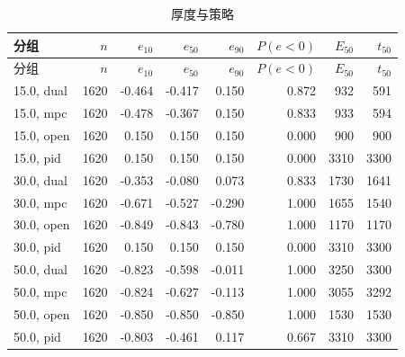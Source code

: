 \begin{longtable}{lrrrrrrr}
\caption{厚度与策略}\\
\toprule
分组 & $n$ & $e_{10}$ & $e_{50}$ & $e_{90}$ & $P(e{<}0)$ & $E_{50}$ & $t_{50}$ \\
\midrule
\endfirsthead
\toprule
分组 & $n$ & $e_{10}$ & $e_{50}$ & $e_{90}$ & $P(e{<}0)$ & $E_{50}$ & $t_{50}$ \\
\midrule
\endhead
15.0, dual & 1620 & -0.464 & -0.417 & 0.150 & 0.872 & 932 & 591 \\
15.0, mpc & 1620 & -0.478 & -0.367 & 0.150 & 0.833 & 933 & 594 \\
15.0, open & 1620 & 0.150 & 0.150 & 0.150 & 0.000 & 900 & 900 \\
15.0, pid & 1620 & 0.150 & 0.150 & 0.150 & 0.000 & 3310 & 3300 \\
30.0, dual & 1620 & -0.353 & -0.080 & 0.073 & 0.833 & 1730 & 1641 \\
30.0, mpc & 1620 & -0.671 & -0.527 & -0.290 & 1.000 & 1655 & 1540 \\
30.0, open & 1620 & -0.849 & -0.843 & -0.780 & 1.000 & 1170 & 1170 \\
30.0, pid & 1620 & 0.150 & 0.150 & 0.150 & 0.000 & 3310 & 3300 \\
50.0, dual & 1620 & -0.823 & -0.598 & -0.011 & 1.000 & 3250 & 3300 \\
50.0, mpc & 1620 & -0.824 & -0.627 & -0.113 & 1.000 & 3055 & 3292 \\
50.0, open & 1620 & -0.850 & -0.850 & -0.850 & 1.000 & 1530 & 1530 \\
50.0, pid & 1620 & -0.803 & -0.461 & 0.117 & 0.667 & 3310 & 3300 \\
\bottomrule
\end{longtable}

